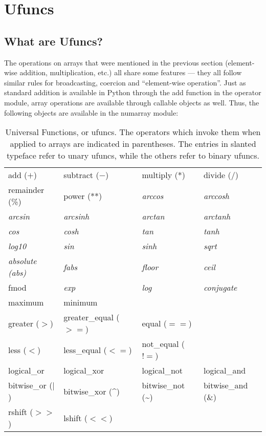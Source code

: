 \chapter{Ufuncs}
\label{cha:ufuncs}

\section{What are Ufuncs?}
\label{sec:what-are-ufuncs}

The operations on arrays that were mentioned in the previous section
(element-wise addition, multiplication, etc.) all share some features --- they
all follow similar rules for broadcasting, coercion and ``element-wise
operation''. Just as standard addition is available in Python through the add
function in the operator module, array operations are available through
callable objects as well. Thus, the following objects are available in the
numarray module:

\begin{table}[htbp]
   \centering
   \caption{Universal Functions, or ufuncs. The operators which invoke them
   when applied to arrays are indicated in parentheses. The entries in slanted
   typeface refer to unary ufuncs, while the others refer to binary ufuncs.} 
   \label{tab:ufuncs}
   \begin{tabular}{llll}
      add ($+$)         & subtract ($-$)   & multiply (*)       & divide ($/$) \\
      remainder (\%)    & power (**)       & \textsl{arccos}    & \textsl{arccosh} \\
      \textsl{arcsin}   & \textsl{arcsinh} & \textsl{arctan}    & \textsl{arctanh} \\
      \textsl{cos}      & \textsl{cosh}    & \textsl{tan}       & \textsl{tanh} \\
      \textsl{log10}    & \textsl{sin}     & \textsl{sinh}      & \textsl{sqrt} \\
      \textsl{absolute (abs)} & \textsl{fabs}    & \textsl{floor}     & \textsl{ceil} \\
      fmod              & \textsl{exp}     & \textsl{log}       & \textsl{conjugate} \\
      maximum           & minimum \\
      greater ($>$)     & greater\_equal ($>=$) & equal ($==$)  \\
      less ($<$)        & less\_equal ($<=$)  & not\_equal ($!=$) \\
      logical\_or       & logical\_xor     & logical\_not  & logical\_and \\
      bitwise\_or ($|$) & bitwise\_xor (\^{}) 
                        & bitwise\_not (\textasciitilde)  & bitwise\_and (\&)
      \\
      rshift ($>>$)       & lshift ($<<$)
   \end{tabular}
\end{table}


